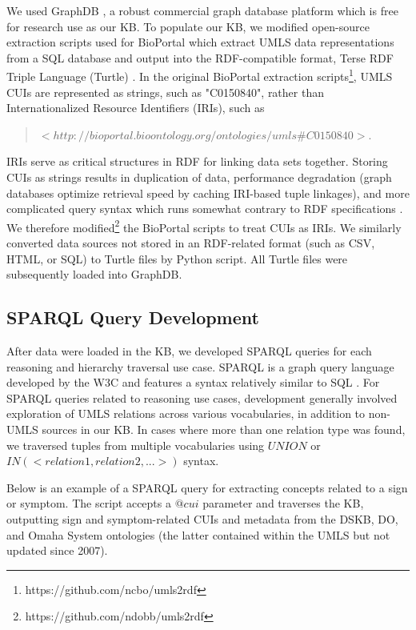 \documentclass[../main.tex]{subfiles}
\begin{document}
We used GraphDB \cite{graphdb}, a robust commercial graph database platform which is free for research use as our KB. To populate our KB, we modified open-source extraction scripts used for BioPortal \cite{noy2009bioportal} which extract UMLS data representations from a SQL database and output into the RDF-compatible format, Terse RDF Triple Language (Turtle) \cite{ttl}. In the original BioPortal extraction scripts\footnote{https://github.com/ncbo/umls2rdf}, UMLS CUIs are represented as strings, such as "C0150840", rather than Internationalized Resource Identifiers (IRIs), such as

\begin{quote}
\centering
$<http://bioportal.bioontology.org/ontologies/ umls\#C0150840>$.
\end{quote}

\noindent IRIs serve as critical structures in RDF for linking data sets together. Storing CUIs as strings results in duplication of data, performance degradation (graph databases optimize retrieval speed by caching IRI-based tuple linkages), and more complicated query syntax which runs somewhat contrary to RDF specifications \cite{manola2004rdf}. We therefore modified\footnote{https://github.com/ndobb/umls2rdf} the BioPortal scripts to treat CUIs as IRIs. We similarly converted data sources not stored in an RDF-related format (such as CSV, HTML, or SQL) to Turtle files by Python script. All Turtle files were subsequently loaded into GraphDB. \\

\subsection{SPARQL Query Development}

After data were loaded in the KB, we developed SPARQL queries for each reasoning and hierarchy traversal use case. SPARQL is a graph query language developed by the W3C and features a syntax relatively similar to SQL \cite{sparql}. For SPARQL queries related to reasoning use cases, development generally involved exploration of UMLS relations across various vocabularies, in addition to non-UMLS sources in our KB. In cases where more than one relation type was found, we traversed tuples from multiple vocabularies using $UNION$ or $IN (<relation1, relation2, ...>)$ syntax.

Below is an example of a SPARQL query for extracting concepts related to a sign or symptom. The script accepts a $@cui$ parameter and traverses the KB, outputting sign and symptom-related CUIs and metadata from the DSKB, DO, and Omaha System ontologies (the latter contained within the UMLS but not updated since 2007).  \\
\end{document}

